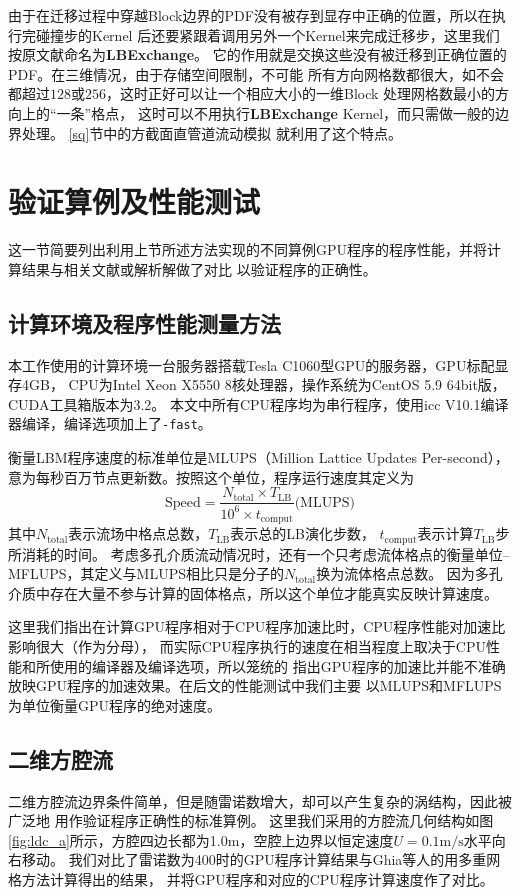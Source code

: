 由于在迁移过程中穿越Block边界的PDF没有被存到显存中正确的位置，所以在执行完碰撞步的Kernel
后还要紧跟着调用另外一个Kernel来完成迁移步，这里我们按原文献命名为\textbf{LBExchange}。
它的作用就是交换这些没有被迁移到正确位置的PDF。在三维情况，由于存储空间限制，不可能
所有方向网格数都很大，如不会都超过$128$或$256$，这时正好可以让一个相应大小的一维Block
处理网格数最小的方向上的“一条”格点，
这时可以不用执行\textbf{LBExchange} Kernel，而只需做一般的边界处理。
\ref{sq}节中的方截面直管道流动模拟
就利用了这个特点。

\section{验证算例及性能测试} \label{sec:speed_standard}
这一节简要列出利用上节所述方法实现的不同算例GPU程序的程序性能，并将计算结果与相关文献或解析解做了对比
以验证程序的正确性。
\subsection{计算环境及程序性能测量方法}
本工作使用的计算环境一台服务器搭载Tesla C1060型GPU的服务器，GPU标配显存4GB，
CPU为Intel Xeon X5550 8核处理器，操作系统为CentOS 5.9 64bit版，CUDA工具箱版本为3.2。
本文中所有CPU程序均为串行程序，使用icc V10.1编译器编译，编译选项加上了\verb+-fast+。

衡量LBM程序速度的标准单位是MLUPS（Million Lattice Updates Per-second），
意为每秒百万节点更新数。按照这个单位，程序运行速度其定义为
\begin{equation}
  \text{Speed} = \frac{N_{\text{total}}\times T_{\text{LB}}}{10^6\times t_{\text{comput}}} \text{(MLUPS)}
  \label{mlups}
\end{equation}
其中$N_{\text{total}}$表示流场中格点总数，$T_{\text{LB}}$表示总的LB演化步数，
$t_{\text{comput}}$表示计算$T_{\text{LB}}$步所消耗的时间。
考虑多孔介质流动情况时，还有一个只考虑流体格点的衡量单位\---
MFLUPS，其定义与MLUPS相比只是分子的$N_{\text{total}}$换为流体格点总数。
因为多孔介质中存在大量不参与计算的固体格点，所以这个单位才能真实反映计算速度。

这里我们指出在计算GPU程序相对于CPU程序加速比时，CPU程序性能对加速比影响很大（作为分母），
而实际CPU程序执行的速度在相当程度上取决于CPU性能和所使用的编译器及编译选项，所以笼统的
指出GPU程序的加速比并能不准确放映GPU程序的加速效果。在后文的性能测试中我们主要
以MLUPS和MFLUPS为单位衡量GPU程序的绝对速度。

\subsection{二维方腔流}
二维方腔流边界条件简单，但是随雷诺数增大，却可以产生复杂的涡结构，因此被广泛地
用作验证程序正确性的标准算例。
这里我们采用的方腔流几何结构如图\ref{fig:ldc_a}所示，方腔四边长都为1.0m，空腔上边界以恒定速度$U=0.1\text{m/s}$水平向右移动。
我们对比了雷诺数为400时的GPU程序计算结果与Ghia等人的用多重网格方法计算得出的结果，
并将GPU程序和对应的CPU程序计算速度作了对比。

